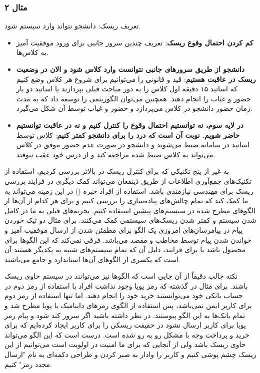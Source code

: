 \subsubsection*{مثال ۲}

تعریف ریسک: دانشجو نتواند وارد سیستم  شود.

\begin{itemize}
    \item \textbf{کم کردن احتمال وقوع ریسک}: تعریف چندین سرور جانبی برای ورود
    موفقیت آمیز به کلاس‌ها.
    \item \textbf{دانشجو از طریق سرو‌ر‌های جانبی نتوانست وارد کلاس شود و الان در
    وضعیت ریسک در عاقبت هستیم}: قید و قانونی را می‌توانیم برای شروع هر کلاس وضع
    کنیم که اساتید ۱۵ دقیقه اول کلاس را به دور مباحث قبلی بپردازند یا اساتید دو
    بار حضور و غیاب را انجام دهند. همچنین می‌توان الگوریتمی را توسعه داد که به
    مدت زمان حضور دانشجو در کلاس می‌پردازد و حضور و غیاب توسط آن شکل می‌گیرد.
    \item \textbf{در لایه سوم، نه توانستیم احتمال وقوع را کنترل کنیم و نه در
    عاقبت توانستیم حاضر شویم. نوبت آن است که درد را برای دانشجو کمتر کنیم}: کلاس
    توسط اساتید در سامانه ضبط می‌شوند و دانشجو در صورت عدم حضور موفق در کلاس
    می‌تواند به کلاس ضبط شده مراجعه کند و از درس خود عقب نیوفتد.
\end{itemize}

به غیر از پنج تکنیکی که برای کنترل ریسک در بالاتر بررسی کردیم، استفاده از
تکنیک‌های جمع‌آوری اطلاعات از طریق ذینفعان می‌تواند کمک دیگری در فرایند بررسی
ریسک برای مهندسی نیازمندی باشد. استفاده از افراد خبره () در این زمینه
می‌تواند به ما کمک کند که تمام چالش‌های پیاده‌سازی را بررسی کنیم و برای هر کدام
از آن‌ها از الگو‌های مطرح شده در سیستم‌های پیشین استفاده کنیم. تجربه‌های قبلی به
ما در کامل شدن سیستم و کمتر شدن ریسک‌های سیستمی کمک می‌کنند. برای مثال دو تیک
خوردن پیام در پیا‌مرسان‌های امروزی یک الگو برای مطمئن شدن از ارسال موفقیت آمیز و
خواندن شدن پیام توسط مخاطب و مقصد می‌باشد. فرقی نمی‌کند که این الگو‌ها برای
محصول باشد یا برای فرایند، دلیل آن که تمام سیستم‌های شبیه به یکدیگر هستند آن است
که یکسری از الگو‌های آن‌ها استاندارد و جامع می‌باشند.

نکته جالب دقیقاً از آن جایی است که الگو‌ها نیز می‌توانند در سیستم حاوی ریسک
باشند. برای مثال در گذشته که رمز پویا وجود نداشت افراد با استفاده از رمز دوم در
حساب بانکی خود می‌توانستند خرید خود را انجام دهند. اما تنها استفاده از رمز دوم
برای کاربر ایمن نمی‌باشد، پس استفاده از الگوی رمز‌های داینامیک یا پویا مطرح شد و
تمام بانک‌ها به این الگو پیوستند. در نظر داشته باشید اگر سرور کند شود و پیام رمز
پویا برای کاربر ارسال نشود در حقیقت ریسکی را برای کاربر ایجاد کرده‌ایم که برای
خرید و پرداخت وجه با مشکل رو به رو شده است. درست است که این الگو می‌تواند حاوی
ریسک باشد ولی از آنجایی که برای ما امنیت در اولویت است می‌توانیم از این ریسک چشم
پوشی کنیم و کاربر را وادار به صبر کردن و طراحی دکمه‌ای به نام "ارسال مجدد رمز"
کنیم.

